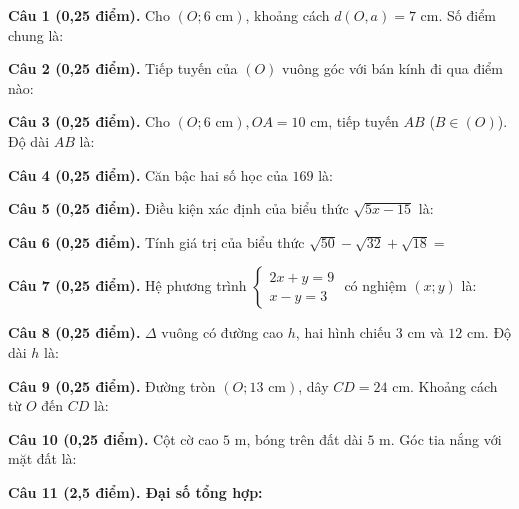 \documentclass[12pt,a4paper]{article}
\begin{document}
\vspace{1.2mm}
\noindent\textbf{Câu 1 (0,25 điểm).} Cho $(O; 6\text{ cm})$, khoảng cách $d(O, a) = 7\text{ cm}$. Số điểm chung là: \par\vspace{0.5mm}
\noindent\textbf{Câu 2 (0,25 điểm).} Tiếp tuyến của $(O)$ vuông góc với bán kính đi qua điểm nào: \par\vspace{0.5mm}
\noindent\textbf{Câu 3 (0,25 điểm).} Cho $(O; 6\text{ cm}), OA = 10\text{ cm}$, tiếp tuyến $AB$ ($B \in (O)$). Độ dài $AB$ là: \par\vspace{0.5mm}
\noindent\textbf{Câu 4 (0,25 điểm).} Căn bậc hai số học của $169$ là: \par\vspace{0.5mm}
\noindent\textbf{Câu 5 (0,25 điểm).} Điều kiện xác định của biểu thức $\sqrt{5x - 15}$ là: \par\vspace{0.5mm}
\noindent\textbf{Câu 6 (0,25 điểm).} Tính giá trị của biểu thức $\sqrt{50} - \sqrt{32} + \sqrt{18} = $ \par\vspace{0.5mm}
\noindent\textbf{Câu 7 (0,25 điểm).} Hệ phương trình $\begin{cases} 2x + y = 9 \\ x - y = 3 \end{cases}$ có nghiệm $(x; y)$ là: \par\vspace{0.5mm}
\noindent\textbf{Câu 8 (0,25 điểm).} $\Delta$ vuông có đường cao $h$, hai hình chiếu $3\text{ cm}$ và $12\text{ cm}$. Độ dài $h$ là: \par\vspace{0.5mm}
\noindent\textbf{Câu 9 (0,25 điểm).} Đường tròn $(O; 13\text{ cm})$, dây $CD = 24\text{ cm}$. Khoảng cách từ $O$ đến $CD$ là: \par\vspace{0.5mm}
\noindent\textbf{Câu 10 (0,25 điểm).} Cột cờ cao $5\text{ m}$, bóng trên đất dài $5\text{ m}$. Góc tia nắng với mặt đất là: \par\vspace{0.5mm}
\vspace{0.8mm}
\noindent\textbf{Câu 11 (2,5 điểm). Đại số tổng hợp:}
\vspace{0.6mm}
\end{document}
